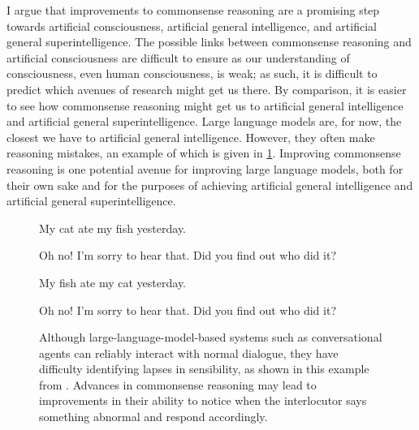 \documentclass[12pt]{report}
\begin{document}
I argue that improvements to commonsense reasoning are a promising step towards artificial consciousness, artificial general intelligence, and artificial general superintelligence.
The possible links between commonsense reasoning and artificial consciousness are difficult to ensure as our understanding of consciousness, even human consciousness, is weak; as such, it is difficult to predict which avenues of research might get us there.
By comparison, it is easier to see how commonsense reasoning might get us to artificial general intelligence and artificial general superintelligence.
Large language models are, for now, the closest we have to artificial general intelligence.
However, they often make reasoning mistakes, an example of which is given in \cref{fig:fish-ate-cat}.
Improving commonsense reasoning is one potential avenue for improving large language models, both for their own sake and for the purposes of achieving artificial general intelligence and artificial general superintelligence.

\begin{figure}
    \begin{minipage}{.5\textwidth}
        \begin{rightbubbles}
            My cat ate my fish yesterday. 
        \end{rightbubbles}
        \begin{leftbubbles}
            Oh no!
            I'm sorry to hear that.
            Did you find out who did it?
        \end{leftbubbles}
    \end{minipage}
    \begin{minipage}{.5\textwidth}
        \begin{rightbubbles}
            My fish ate my cat yesterday. 
        \end{rightbubbles}
        \begin{leftbubbles}
            Oh no!
            I'm sorry to hear that.
            Did you find out who did it?
        \end{leftbubbles}
    \end{minipage}
    \caption{
        Although large-language-model-based systems such as conversational agents can reliably interact with normal dialogue, they have difficulty identifying lapses in sensibility, as shown in this example from \cite{Richardson2023-mq}. 
        Advances in commonsense reasoning may lead to improvements in their ability to notice when the interlocutor says something abnormal and respond accordingly.}
    \label{fig:fish-ate-cat}
\end{figure}
\end{document}
